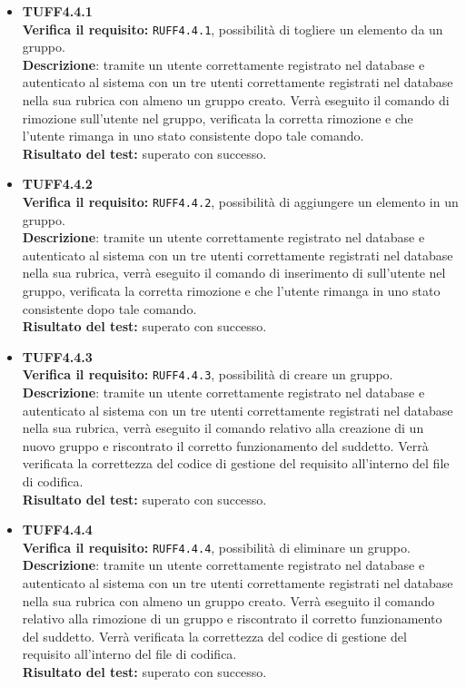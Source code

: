 \begin{itemize}
\item \textbf{TUFF4.4.1}\\
\textbf{Verifica il requisito:} \texttt{RUFF4.4.1}, possibilità di togliere un elemento da un gruppo.\\
\textbf{Descrizione}: tramite un utente  correttamente registrato nel database e autenticato al sistema con un tre utenti  correttamente registrati nel database nella sua rubrica con almeno un gruppo creato. Verrà eseguito il comando di rimozione sull'utente nel gruppo, verificata la corretta rimozione e che l'utente rimanga in uno stato consistente dopo tale comando.\\
\textbf{Risultato del test:} superato con successo.

\item \textbf{TUFF4.4.2}\\
\textbf{Verifica il requisito:} \texttt{RUFF4.4.2}, possibilità di aggiungere un elemento in un gruppo.\\
\textbf{Descrizione}: tramite un utente  correttamente registrato nel database e autenticato al sistema con un tre utenti  correttamente registrati nel database nella sua rubrica, verrà eseguito il comando di inserimento di sull'utente nel gruppo, verificata la corretta rimozione e che l'utente rimanga in uno stato consistente dopo tale comando.\\
\textbf{Risultato del test:} superato con successo.

\item \textbf{TUFF4.4.3}\\
\textbf{Verifica il requisito:} \texttt{RUFF4.4.3}, possibilità di creare un gruppo.\\
\textbf{Descrizione}: tramite un utente  correttamente registrato nel database e autenticato al sistema con un tre utenti  correttamente registrati nel database nella sua rubrica, verrà eseguito il comando relativo alla creazione di un nuovo gruppo e riscontrato il corretto funzionamento del suddetto. Verrà verificata la correttezza del codice di gestione del requisito all'interno del file di codifica.\\
\textbf{Risultato del test:} superato con successo.

\item \textbf{TUFF4.4.4}\\
\textbf{Verifica il requisito:} \texttt{RUFF4.4.4}, possibilità di eliminare un gruppo.\\
\textbf{Descrizione}: tramite un utente  correttamente registrato nel database e autenticato al sistema con un tre utenti  correttamente registrati nel database nella sua rubrica con almeno un gruppo creato. Verrà eseguito il comando relativo alla rimozione di un gruppo e riscontrato il corretto funzionamento del suddetto. Verrà verificata la correttezza del codice di gestione del requisito all'interno del file di codifica.\\
\textbf{Risultato del test:} superato con successo.


\end{itemize}
